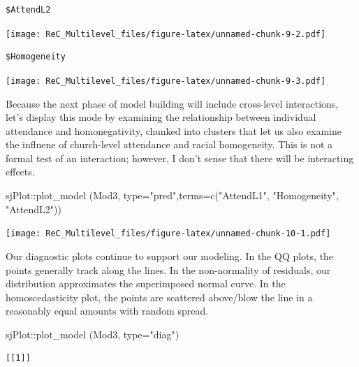 \documentclass[
  english,
]{book}
\newenvironment{Shaded}{\begin{snugshade}}{\end{snugshade}}
\newcommand{\AttributeTok}[1]{\textcolor[rgb]{0.77,0.63,0.00}{#1}}
\newcommand{\FunctionTok}[1]{\textcolor[rgb]{0.00,0.00,0.00}{#1}}
\newcommand{\NormalTok}[1]{#1}
\newcommand{\SpecialCharTok}[1]{\textcolor[rgb]{0.00,0.00,0.00}{#1}}
\newcommand{\StringTok}[1]{\textcolor[rgb]{0.31,0.60,0.02}{#1}}
\begin{document}
\begin{verbatim}
$AttendL2
\end{verbatim}

\texttt{[image: ReC\_Multilevel\_files/figure-latex/unnamed-chunk-9-2.pdf]}

\begin{verbatim}
$Homogeneity
\end{verbatim}

\texttt{[image: ReC\_Multilevel\_files/figure-latex/unnamed-chunk-9-3.pdf]}

Because the next phase of model building will include cross-level interactions, let's display this mode by examining the relationship between individual attendance and homonegativity, chunked into clusters that let us also examine the influene of church-level attendance and racial homogeneity. This is not a formal test of an interaction; however, I don't sense that there will be interacting effects.

\begin{Shaded}
\begin{Highlighting}[]
\NormalTok{sjPlot}\SpecialCharTok{::}\FunctionTok{plot\_model}\NormalTok{ (Mod3, }\AttributeTok{type=}\StringTok{"pred"}\NormalTok{,}\AttributeTok{terms=}\FunctionTok{c}\NormalTok{(}\StringTok{"AttendL1"}\NormalTok{, }\StringTok{"Homogeneity"}\NormalTok{, }\StringTok{"AttendL2"}\NormalTok{))}
\end{Highlighting}
\end{Shaded}

\texttt{[image: ReC\_Multilevel\_files/figure-latex/unnamed-chunk-10-1.pdf]}

Our diagnostic plots continue to support our modeling. In the QQ plots, the points generally track along the lines. In the non-normality of residuals, our distribution approximates the superimposed normal curve. In the homoscedasticity plot, the points are scattered above/blow the line in a reasonably equal amounts with random spread.

\begin{Shaded}
\begin{Highlighting}[]
\NormalTok{sjPlot}\SpecialCharTok{::}\FunctionTok{plot\_model}\NormalTok{ (Mod3, }\AttributeTok{type=}\StringTok{"diag"}\NormalTok{)}
\end{Highlighting}
\end{Shaded}

\begin{verbatim}
[[1]]
\end{verbatim}
\end{document}
